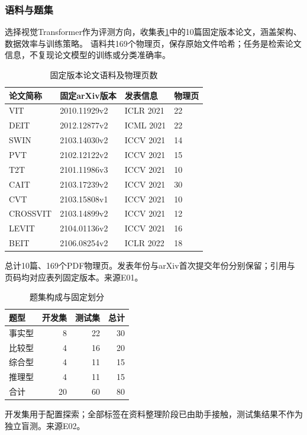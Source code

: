 \documentclass[UTF8,a4paper,zihao=-4,fontset=fandol]{ctexart}
\newcommand{\ReportTableStyle}{\fontsize{10.5}{14}\selectfont\setstretch{1.15}%
 \setlength{\tabcolsep}{4.5pt}\renewcommand{\arraystretch}{1.28}}
\begin{document}
\subsubsection{语料与题集}
选择视觉Transformer作为评测方向，收集表\ref{tab:corpus}中的10篇固定版本论文，涵盖架构、数据效率与训练策略。
语料共169个物理页，保存原始文件哈希；任务是检索论文信息，不复现论文模型的训练或分类准确率。
\begin{table}[htbp]\centering
\caption{固定版本论文语料及物理页数}\label{tab:corpus}
\ReportTableStyle
\begin{tabularx}{\linewidth}{@{}Xlll@{}}\toprule\rowcolor{TableHead}
\textbf{论文简称} & \textbf{固定arXiv版本} & \textbf{发表信息} & \textbf{物理页} \\ \midrule
VIT\cite{vit} & 2010.11929v2 & ICLR 2021 & 22 \\
DEIT\cite{deit} & 2012.12877v2 & ICML 2021 & 22 \\
SWIN\cite{swin} & 2103.14030v2 & ICCV 2021 & 14 \\
PVT\cite{pvt} & 2102.12122v2 & ICCV 2021 & 15 \\
T2T\cite{t2t} & 2101.11986v3 & ICCV 2021 & 10 \\
CAIT\cite{cait} & 2103.17239v2 & ICCV 2021 & 30 \\
CVT\cite{cvt} & 2103.15808v1 & ICCV 2021 & 10 \\
CROSSVIT\cite{crossvit} & 2103.14899v2 & ICCV 2021 & 12 \\
LEVIT\cite{levit} & 2104.01136v2 & ICCV 2021 & 16 \\
BEIT\cite{beit} & 2106.08254v2 & ICLR 2022 & 18 \\
\bottomrule\end{tabularx}
\par\vspace{2pt}\begin{minipage}{\linewidth}\footnotesize 总计10篇、169个PDF物理页。发表年份与arXiv首次提交年份分别保留；引用与页码均对应表列固定版本。来源E01。\end{minipage}
\end{table}
\begin{table}[htbp]\centering
\caption{题集构成与固定划分}\label{tab:dataset}
\ReportTableStyle
\begin{tabularx}{\linewidth}{@{}Xrrr@{}}\toprule\rowcolor{TableHead}
\textbf{题型} & \textbf{开发集} & \textbf{测试集} & \textbf{总计} \\ \midrule
事实型 & 8 & 22 & 30 \\
比较型 & 4 & 16 & 20 \\
综合型 & 4 & 11 & 15 \\
推理型 & 4 & 11 & 15 \\
合计 & 20 & 60 & 80 \\
\bottomrule\end{tabularx}
\par\vspace{2pt}\begin{minipage}{\linewidth}\footnotesize 开发集用于配置探索；全部标签在资料整理阶段已由助手接触，测试集结果不作为独立盲测。来源E02。\end{minipage}
\end{table}
\end{document}
